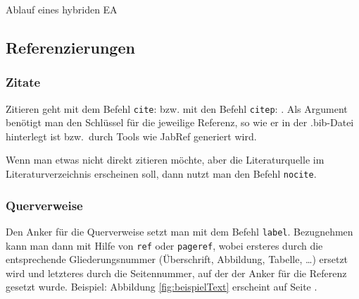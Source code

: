         \begin{center}
        \begin{algorithm}[ht]
        \DontPrintSemicolon
        \LinesNumbered
        \caption{Ablauf eines hybriden EA}
        \label{alg:eaHybrid}
        \end{algorithm}
        \end{center}
        

    
\subsection{Referenzierungen}
    \subsubsection{Zitate}
    Zitieren geht mit dem Befehl \texttt{cite}: \cite{Claus98a} bzw. mit den Befehl
    \texttt{citep}: \citep{wagner2009tele}. Als Argument
    benötigt man den Schlüssel für die jeweilige Referenz, so wie er in der
    .bib-Datei hinterlegt ist bzw.~durch Tools wie JabRef generiert wird. 
    
    Wenn man etwas nicht direkt zitieren möchte, aber die Literaturquelle im
    Literaturverzeichnis erscheinen soll, dann nutzt man den Befehl
    \texttt{nocite}.
    
    \subsubsection{Querverweise}
    Den Anker für die Querverweise setzt man mit dem Befehl \texttt{label}.
    Bezugnehmen kann man dann mit Hilfe von \texttt{ref} oder \texttt{pageref},
    wobei ersteres durch die entsprechende Gliederungsnummer (Überschrift,
    Abbildung, Tabelle, \ldots) ersetzt wird und letzteres durch die
    Seitennummer, auf der der Anker für die Referenz gesetzt wurde.
    Beispiel: Abbildung \ref{fig:beispielText} erscheint auf Seite
    \pageref{fig:beispielText}.
    
